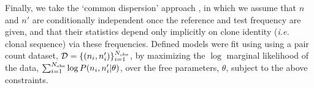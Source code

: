 \documentclass[letterpaper,english,prl,reprint,longbibliography]{revtex4-1}
\begin{document}




Finally, we take the `common dispersion' approach \citep{Robinson2008}, in which we assume that $n$ and $n'$ are conditionally independent once the reference and test frequency are given, and that their statistics depend only implicitly on clone identity (\emph{i.e.} clonal sequence) via these frequencies.
Defined models were fit using using a pair count dataset, $\mathcal{D}=\{(n_i,n'_i)\}_{i=1}^{N_{\textrm{\textrm{obs}}}}$, by maximizing the $\log$ marginal likelihood of the data, $\sum_{i=1}^{N_{\textrm{\textrm{obs}}}} \log P(n_i,n'_i|\theta)$, over the free parameters, $\theta$, subject to the above constraints.
\end{document}
